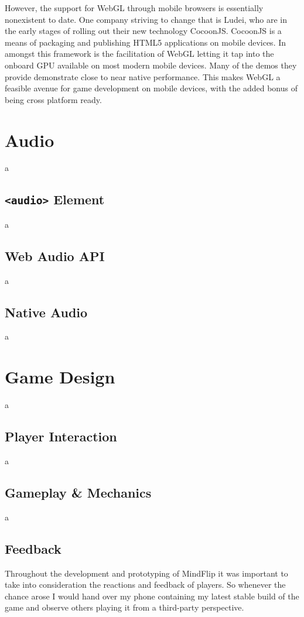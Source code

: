 \documentclass[final]{cmpreport}
\begin{document}
However, the support for WebGL through mobile browsers is essentially nonexistent to date. One company striving to change that is Ludei, who are in the early stages of rolling out their new technology CocoonJS. CocoonJS is a means of packaging and publishing HTML5 applications on mobile devices. In amongst this framework is the facilitation of WebGL letting it tap into the onboard GPU available on most modern mobile devices. Many of the demos they provide demonstrate close to near native performance. This makes WebGL a feasible avenue for game development on mobile devices, with the added bonus of being cross platform ready.

\section{Audio}
a

\subsection{\texttt{<audio>} Element}
a

\subsection{Web Audio API}
a

\subsection{Native Audio}
a

\section{Game Design}
a

\subsection{Player Interaction}
a

\subsection{Gameplay \& Mechanics}
a

\subsection{Feedback}
Throughout the development and prototyping of MindFlip it was important to take into consideration the reactions and feedback of players. So whenever the chance arose I would hand over my phone containing my latest stable build of the game and observe others playing it from a third-party perspective.
\end{document}
